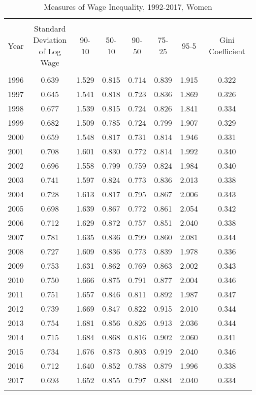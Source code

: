 
\begin{table}[!htbp] \centering 
  \caption{Measures of Wage Inequality, 1992-2017, Women} 
  \label{tab:tab_wage_ineq_measures_women} 
\begin{tabular}{@{\extracolsep{5pt}} cccccccc} 
\\[-1.8ex]\hline 
\hline \\[-1.8ex] 
Year & \thead{Standard \\ Deviation \\ of Log Wage} & 90-10 & 50-10 & 90-50 & 75-25 & 95-5 & Gini Coefficient \\ 
\hline \\[-1.8ex] 
1996 & 0.639 & 1.529 & 0.815 & 0.714 & 0.839 & 1.915 & 0.322 \\ 
1997 & 0.645 & 1.541 & 0.818 & 0.723 & 0.836 & 1.869 & 0.326 \\ 
1998 & 0.677 & 1.539 & 0.815 & 0.724 & 0.826 & 1.841 & 0.334 \\ 
1999 & 0.682 & 1.509 & 0.785 & 0.724 & 0.799 & 1.907 & 0.329 \\ 
2000 & 0.659 & 1.548 & 0.817 & 0.731 & 0.814 & 1.946 & 0.331 \\ 
2001 & 0.708 & 1.601 & 0.830 & 0.772 & 0.814 & 1.992 & 0.340 \\ 
2002 & 0.696 & 1.558 & 0.799 & 0.759 & 0.824 & 1.984 & 0.340 \\ 
2003 & 0.741 & 1.597 & 0.824 & 0.773 & 0.836 & 2.013 & 0.338 \\ 
2004 & 0.728 & 1.613 & 0.817 & 0.795 & 0.867 & 2.006 & 0.343 \\ 
2005 & 0.698 & 1.639 & 0.867 & 0.772 & 0.861 & 2.054 & 0.342 \\ 
2006 & 0.712 & 1.629 & 0.872 & 0.757 & 0.851 & 2.040 & 0.338 \\ 
2007 & 0.781 & 1.635 & 0.836 & 0.799 & 0.860 & 2.081 & 0.344 \\ 
2008 & 0.727 & 1.609 & 0.836 & 0.773 & 0.839 & 1.978 & 0.336 \\ 
2009 & 0.753 & 1.631 & 0.862 & 0.769 & 0.863 & 2.002 & 0.343 \\ 
2010 & 0.750 & 1.666 & 0.875 & 0.791 & 0.877 & 2.004 & 0.346 \\ 
2011 & 0.751 & 1.657 & 0.846 & 0.811 & 0.892 & 1.987 & 0.347 \\ 
2012 & 0.739 & 1.669 & 0.847 & 0.822 & 0.915 & 2.010 & 0.344 \\ 
2013 & 0.754 & 1.681 & 0.856 & 0.826 & 0.913 & 2.036 & 0.344 \\ 
2014 & 0.715 & 1.684 & 0.868 & 0.816 & 0.902 & 2.060 & 0.341 \\ 
2015 & 0.734 & 1.676 & 0.873 & 0.803 & 0.919 & 2.040 & 0.346 \\ 
2016 & 0.712 & 1.640 & 0.852 & 0.788 & 0.879 & 1.996 & 0.338 \\ 
2017 & 0.693 & 1.652 & 0.855 & 0.797 & 0.884 & 2.040 & 0.334 \\ 
\hline \\[-1.8ex] 
\end{tabular} 
\end{table} 
